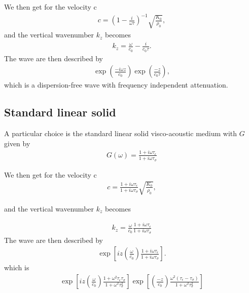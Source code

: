 \documentclass[11pt]{article}
\begin{document}
{We then get for the velocity c
\begin{eqnarray}
 c=\left(1-\frac{i}{\omega\tau}\right)^{-1}\sqrt{\frac{K_0}{\rho_0}},
                               \label{eq:23}
\end{eqnarray}
 and the vertical wavenumber $k_z$ becomes
\begin{eqnarray}
 k_z = \frac{\omega}{c_0} - \frac{i}{c_0\tau}.
                               \label{eq:24}
\end{eqnarray}
The wave are then described by
\begin{eqnarray}
 \exp\left(\frac{-i\omega z}{c_0}\right)\exp(\frac{-z}{c_0\tau}),
                               \label{eq:25}
\end{eqnarray}
 which is a dispersion-free wave with frequency independent
 attenuation.
\subsection*{Standard linear solid}
A particular choice is the standard linear solid visco-acoustic
medium with $G$ given by \citep{Casula1992}
\begin{eqnarray}
 G(\omega) = \frac{1+i\omega\tau_{\epsilon}}{1+i\omega\tau_{\sigma}}
\end{eqnarray}

We then get for the velocity c
\begin{eqnarray}
 c=\frac{1+i\omega\tau_{\epsilon}}{1+i\omega\tau_{\sigma}}
\sqrt{\frac{K_0}{\rho_0}},
\end{eqnarray}

 and the vertical wavenumber $k_z$ becomes

\begin{eqnarray}
 k_z = \frac{\omega}{c_0}\frac{1+i\omega\tau_{\epsilon}}{1+i\omega\tau_{\sigma}}
\end{eqnarray}
The wave are then described by
\begin{eqnarray}
 \exp\left[iz \left(\frac{\omega}{c_0}\right)
      \frac{1+i\omega\tau_{\epsilon}}{1+i\omega\tau_{\sigma}}
     \right].
\end{eqnarray}
which is 
\begin{eqnarray}
 \exp\left[iz\left(\frac{\omega}{c_0}\right)
             \frac{1+\omega^2\tau_{\epsilon}\tau_{\sigma}}
                  {1+\omega^2\tau^2_{\sigma}}
             \right]
 \exp\left[\left(\frac{-z}{c_0}\right)
             \frac{\omega^2(\tau_{\epsilon}-\tau_{\sigma})}
                  {1+\omega^2\tau^2_{\sigma}}
             \right]
\end{eqnarray}

}
\end{document}
